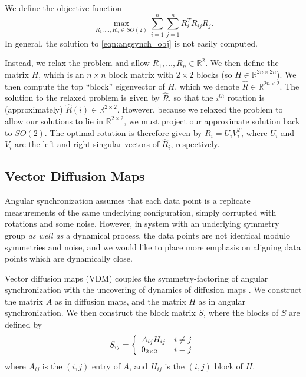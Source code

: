 \documentclass[10pt]{article}
\begin{document}
We define the objective function 
\begin{equation} \label{eqn:angsynch_obj}
\max_{R_1, \dots, R_n \in SO(2)} \sum_{i=1}^{n} \sum_{j=1}^{n} R_i^T R_{ij} R_j.
\end{equation}
%
In general, the solution to \eqref{eqn:angsynch_obj} is not easily computed.

Instead, we relax the problem and allow $R_1, \dots, R_n \in \mathbb{R}^2$.
%
We then define the matrix $H$, which is an $n \times n$ block matrix with $2 \times 2$ blocks (so $H \in \mathbb{R}^{2n \times 2n}$).
%
We then compute the top ``block'' eigenvector of $H$, which we denote $\hat{R} \in \mathbb{R}^{2n \times 2}$. 
%
The solution to the relaxed problem is given by $\hat{R}$, so that the $i^{th}$ rotation is (approximately) $\hat{R}(i) \in \mathbb{R}^{2 \times 2}$.
%
However, because we relaxed the problem to allow our solutions to lie in $\mathbb{R}^{2 \times 2}$, we must project our approximate solution back to $SO(2)$.
%
The optimal rotation is therefore given by $R_i = U_i V_i^T$, where $U_i$ and $V_i$ are the left and right singular vectors of $\hat{R}_i$, respectively. 

\subsection*{Vector Diffusion Maps} 

Angular synchronization assumes that each data point is a replicate measurements of the same underlying configuration, simply corrupted with rotations and some noise.
%
However, in system with an underlying symmetry group {\em as well as} a dynamical process, the data points are not identical modulo symmetries and noise, and we would like to place more emphasis on aligning data points which are dynamically close.

Vector diffusion maps (VDM) couples the symmetry-factoring of angular synchronization with the uncovering of dynamics of diffusion maps \cite{singer2012vector}. 
%
We construct the matrix $A$ as in diffusion maps, and the matrix $H$ as in angular synchronization.
%
We then construct the block matrix $S$, where the blocks of $S$ are defined by
\begin{equation}
S_{ij} = \left\{ \begin{array}{l l} 
A_{ij} H_{ij} & i \ne j \\
0_{2 \times 2} & i = j
\end{array}
\right.
\end{equation}
%
where $A_{ij}$ is the $(i,j)$ entry of $A$, and $H_{ij}$ is the $(i,j)$ block of $H$. 
\end{document}
